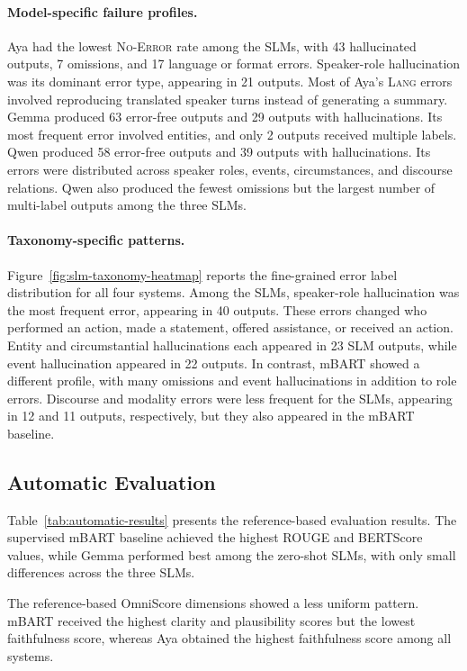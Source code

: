 \documentclass[11pt]{article}
\begin{document}
\paragraph{Model-specific failure profiles.}
Aya had the lowest \textsc{No-Error} rate among the SLMs, with 43 hallucinated outputs, 7 omissions, and 17 language or format errors. Speaker-role hallucination was its dominant error type, appearing in 21 outputs. Most of Aya's \textsc{Lang} errors involved reproducing translated speaker turns instead of generating a summary. Gemma produced 63 error-free outputs and 29 outputs with hallucinations. Its most frequent error involved entities, and only 2 outputs received multiple labels. Qwen produced 58 error-free outputs and 39 outputs with hallucinations. Its errors were distributed across speaker roles, events, circumstances, and discourse relations. Qwen also produced the fewest omissions but the largest number of multi-label outputs among the three SLMs.

\paragraph{Taxonomy-specific patterns.}
Figure~\ref{fig:slm-taxonomy-heatmap} reports the fine-grained error label distribution for all four systems. Among the SLMs, speaker-role hallucination was the most frequent error, appearing in 40 outputs. These errors changed who performed an action, made a statement, offered assistance, or received an action. Entity and circumstantial hallucinations each appeared in 23 SLM outputs, while event hallucination appeared in 22 outputs. In contrast, mBART showed a different profile, with many omissions and event hallucinations in addition to role errors. Discourse and modality errors were less frequent for the SLMs, appearing in 12 and 11 outputs, respectively, but they also appeared in the mBART baseline.

\subsection{Automatic Evaluation}

Table~\ref{tab:automatic-results} presents the reference-based evaluation results. The supervised mBART baseline achieved the highest ROUGE and BERTScore values, while Gemma performed best among the zero-shot SLMs, with only small differences across the three SLMs.

The reference-based OmniScore dimensions showed a less uniform pattern. mBART received the highest clarity and plausibility scores but the lowest faithfulness score, whereas Aya obtained the highest faithfulness score among all systems.
\end{document}

